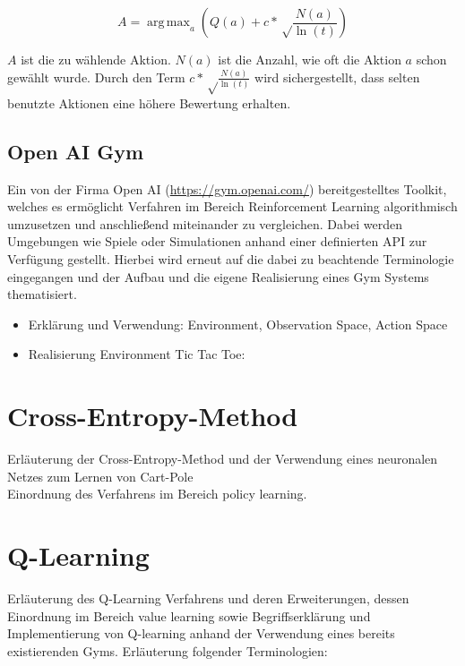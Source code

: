 \documentclass[11pt]{scrartcl}
\DeclareMathOperator*{\argmax}{arg\,max}
\begin{document}
\[ A = \argmax_a\left( Q(a) + c*\sqrt\frac{N(a)}{\ln(t)} \right) \]

\noindent
$A$ ist die zu wählende Aktion. $N(a)$ ist die Anzahl, wie oft die Aktion $a$ schon
gewählt wurde. Durch den Term $c*\sqrt\frac{N(a)}{\ln(t)}$ wird sichergestellt, dass
selten benutzte Aktionen eine höhere Bewertung erhalten.


\newpage
\subsection{Open AI Gym}
Ein von der Firma Open AI (\url{https://gym.openai.com/}) bereitgestelltes Toolkit,
welches es ermöglicht Verfahren im Bereich Reinforcement Learning algorithmisch umzusetzen
und anschließend miteinander zu vergleichen. Dabei werden Umgebungen wie Spiele oder
Simulationen anhand einer definierten API zur Verfügung gestellt. Hierbei wird erneut auf
die dabei zu beachtende Terminologie eingegangen und der Aufbau und die eigene
Realisierung eines Gym Systems thematisiert.

\begin{itemize}
\itemsep0pt
\item Erklärung und Verwendung: Environment, Observation Space, Action Space
\item Realisierung Environment Tic Tac Toe:
\end{itemize}

\section{Cross-Entropy-Method}
Erläuterung der Cross-Entropy-Method und der Verwendung eines neuronalen Netzes zum Lernen
von Cart-Pole
\\
Einordnung des Verfahrens im Bereich policy learning.

\section{Q-Learning}
Erläuterung des Q-Learning Verfahrens und deren Erweiterungen, dessen Einordnung im
Bereich value learning sowie Begriffserklärung und Implementierung von Q-learning anhand
der Verwendung eines bereits existierenden Gyms. Erläuterung folgender Terminologien:
\end{document}
